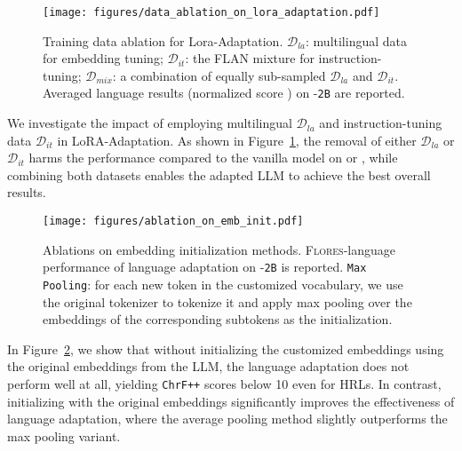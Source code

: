\begin{figure}[t]
    \setlength{\abovecaptionskip}{-0.0001cm}
    \setlength{\belowcaptionskip}{-0.25cm}
    \centering
    \texttt{[image: figures/data\_ablation\_on\_lora\_adaptation.pdf]}
    \vspace{-8mm}
    \caption{Training data ablation for Lora-Adaptation. $\mathcal{D}_{la}$: multilingual data for embedding tuning; $\mathcal{D}_{it}$: the FLAN mixture for instruction-tuning; $\mathcal{D}_{mix}$: a combination of equally sub-sampled $\mathcal{D}_{la}$ and $\mathcal{D}_{it}$. Averaged \sea language results (normalized score \versus \ouradapter) on \gemmatwo-\texttt{2B} are reported.}
    \vspace{-6mm}
    \label{fig:data_ablation_on_lora_adaptation}
\end{figure}
We investigate the impact of employing multilingual $\mathcal{D}_{la}$ and instruction-tuning data $\mathcal{D}_{it}$ in LoRA-Adaptation. As shown in Figure~\ref{fig:data_ablation_on_lora_adaptation}, the removal of either $\mathcal{D}_{la}$ or $\mathcal{D}_{it}$ harms the performance compared to the vanilla \ouradapter model on \flores or \belebele, while combining both datasets enables the adapted LLM to achieve the best overall results.

\begin{figure}[t]
    \setlength{\abovecaptionskip}{-0.0001cm}
    \setlength{\belowcaptionskip}{-0.25cm}
    \centering
    \texttt{[image: figures/ablation\_on\_emb\_init.pdf]}
    \vspace{-8mm}
    \caption{Ablations on embedding initialization methods. \textsc{Flores}-\sea language performance of language adaptation on \gemmatwo-\texttt{2B} is reported. \texttt{Max Pooling}: for each new token in the customized vocabulary, we use the original tokenizer to tokenize it and apply max pooling over the embeddings of the corresponding subtokens as the initialization.}
    \vspace{-5mm}
    \label{fig:ablation_on_emb_init}
\end{figure}
In Figure~\ref{fig:ablation_on_emb_init}, we show that without initializing the customized embeddings using the original embeddings from the LLM, the language adaptation does not perform well at all, yielding \texttt{ChrF++} scores below 10 even for HRLs. In contrast, initializing with the original embeddings significantly improves the effectiveness of language adaptation, where the average pooling method slightly outperforms the max pooling variant.

